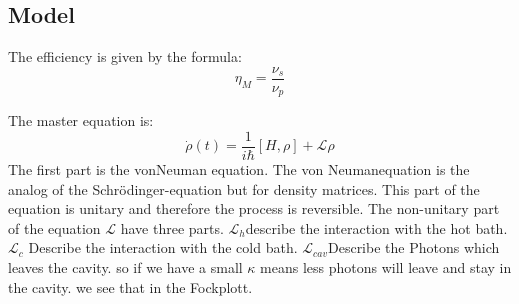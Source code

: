 \documentclass[12pt,a4paper]{article}
\begin{document}
\subsection{Model}

The efficiency is given by the formula:
\begin{equation}
\eta_M=\frac{\nu_s}{\nu_p}
\end{equation}

\newpage
The master equation is:
\begin{equation}
\dot{\rho}(t)=\frac{1}{i \hbar}[H,\rho]+ \mathcal{L}\rho
\end{equation}
The first part is the vonNeuman equation. The von Neumanequation is the analog of the Schrödinger-equation but for density matrices. This part of the equation is unitary and therefore the process is reversible.
The non-unitary part of the equation 
$\mathcal{L}$ have three parts. $\mathcal{L}_h$describe the interaction with the hot bath.
$\mathcal{L}_c$ Describe the interaction with the cold bath.
$\mathcal{L}_{cav}$Describe the Photons which leaves the cavity. so if we have a small $\kappa$ means less photons will leave and stay in the cavity. we see that in the Fockplott.
\end{document}

